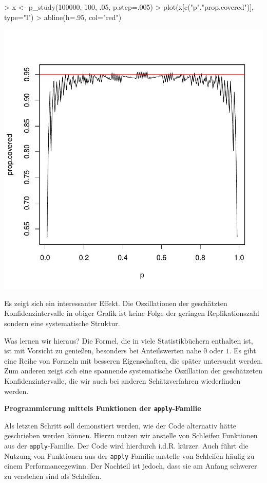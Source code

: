 \begin{Schunk}
\begin{Sinput}
> x <- p_study(100000, 100, .05, p.step=.005) 
> plot(x[c("p","prop.covered")], type="l") 
> abline(h=.95, col="red")
\end{Sinput}
\end{Schunk}
\includegraphics{sim_binomial_prop-013}

Es zeigt sich ein interessanter Effekt. Die Oszillationen der geschätzten Konfidenzintervalle in obiger Grafik ist keine Folge der geringen Replikationszahl sondern eine systematische Struktur.

Was lernen wir hieraus? Die Formel, die in viele Statistikbüchern enthalten ist, ist mit Vorsicht zu genießen, besonders bei Anteilswerten nahe $0$ oder $1$. Es gibt eine Reihe von Formeln mit besseren Eigenschaften, die später untersucht werden. Zum anderen zeigt sich eine spannende systematische Oszillation der geschätzeten Konfidenzintervalle, die wir auch bei anderen Schätzverfahren wiederfinden werden.

\textbf{Programmierung mittels Funktionen der \texttt{apply}-Familie}  

Als letzten Schritt soll demonstiert werden, wie der Code alternativ hätte geschrieben werden können. Hierzu nutzen wir anstelle von Schleifen Funktionen aus der \texttt{apply}-Familie. Der Code wird hierdurch i.d.R. kürzer. Auch führt die Nutzung von Funktionen aus der \texttt{apply}-Familie anstelle von Schleifen häufig zu einem Performancegewinn. Der Nachteil ist jedoch, dass sie am Anfang schwerer zu verstehen sind als Schleifen.
 

